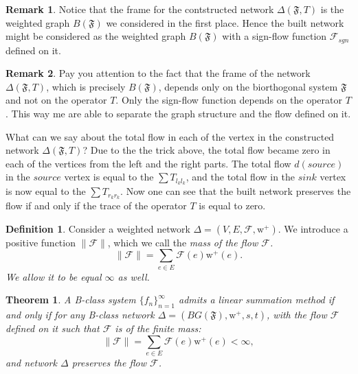 \documentclass[12pt]{article}
\newtheorem{theorem}{Theorem}
\theoremstyle{definition}
\newtheorem{remark}{Remark}
\newtheorem{definition}{Definition}
\newcommand{\seq}[1]{\{{#1}_n\}_{n=1}^\infty}
\newcommand{\fsys}{\mathfrak{F}}
\newcommand{\wtpos}{\mathrm{w}^+}
\newcommand{\flow}{\mathcal{F}}
\newcommand{\flowsgn}{\mathcal{F}_{sgn}}
\newcommand{\source}{\mathit{source}}
\newcommand{\sink}{\mathit{sink}}
\newcommand{\net}{\Delta}
\numberwithin{remark}{section}
\numberwithin{theorem}{section}
\numberwithin{prop}{section}
\numberwithin{equation}{section}
\numberwithin{lemma}{section}
\numberwithin{prop_under_lemma}{lemma}
\begin{document}
    \begin{remark}
      Notice that the frame for the contstructed network $\net(\fsys, T)$ is the weighted graph $B(\fsys)$
      we considered in the first place.
      Hence the built network might be considered as the weighted graph $B(\fsys)$ with a sign-flow function
      $\flowsgn$ defined on it.
    \end{remark}
    \begin{remark}
      Pay you attention to the fact that the frame of the network $\net(\fsys, T)$, which is precisely $B(\fsys)$,
      depends only on the biorthogonal system $\fsys$ and not on the operator $T$.
      Only the sign-flow function depends on the operator $T$.
      This way me are able to separate the graph structure and the flow defined on it.
    \end{remark}
    What can we say about the total flow in each of the vertex in the constructed network $\net(\fsys, T)$?
    Due to the the trick above, the total flow became zero in each of the vertices from the left and the right parts.
    The total flow $d(\source)$ in the $\source$ vertex is equal to the $\sum T_{l_k l_k}$, and the total flow in the
    $\sink$ vertex is now equal to the $\sum T_{r_k r_k}$.
    Now one can see that the built network preserves the flow if and only if the trace of the operator $T$ is equal to
    zero.
    \begin{definition}
      Consider a weighted network $\net = (V, E, \flow, \wtpos)$.
      We introduce a positive function $\|\flow\|$, which we call the \it{mass of the flow} $\flow$.
      $$
        \|\flow\| = \sum_{e \in E} \flow(e) \wtpos(e).
      $$
      We allow it to be equal $\infty$ as well.
    \end{definition}
    \begin{theorem}
      \label{thm-graph-eq}
        A B-class system $\seq{f}$ admits a linear summation method if and only if for any 
        B-class network $\net = (BG(\fsys), \wtpos, s, t)$, with the flow $\flow$ defined on it such that
        $\flow$ is of the finite mass:
        $$
          \|\flow\| = \sum_{e \in E} \flow(e) \wtpos(e) < \infty,
        $$
        and network $\net$ preserves the flow $\flow$.
    \end{theorem}
\end{document}
